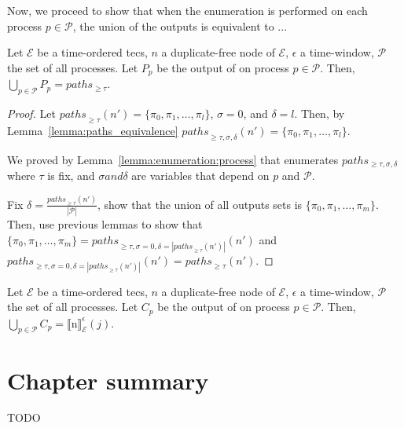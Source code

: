 Now, we proceed to show that when the enumeration is performed on each process $p \in \mathcal{P}$, the union of the outputs is equivalent to ...

\begin{lemma}\label{lemma:union_of_paths}
  Let $\mathcal{E}$ be a time-ordered \acrshort{tecs}, $n$ a duplicate-free node of $\mathcal{E}$, $\epsilon$ a time-window, $\mathcal{P}$ the set of all processes. Let $P_{p}$ be the output of  on process $p \in \mathcal{P}$. Then, $\bigcup\limits_{p \in \mathcal{P}} P_{p} = paths_{\ge \tau}$.
\end{lemma}

\begin{proof}
  Let ${paths}_{\ge \tau}(n') = \{\pi_{0}, \pi_{1}, \ldots, \pi_{l}\}$, $\sigma=0$, and $\delta = l$. Then, by Lemma~\ref{lemma:paths_equivalence} ${paths}_{\ge \tau, \sigma, \delta}(n') = \{\pi_{0}, \pi_{1}, \ldots, \pi_{l}\}$.

  We proved by Lemma~\ref{lemma:enumeration:process} that  enumerates $paths_{\ge \tau, \sigma, \delta}$ where $\tau$ is fix, and $\sigma and \delta$ are variables that depend on $p$ and $\mathcal{P}$.

  Fix $\delta = \frac{{paths}_{\ge \tau}(n')}{|\mathcal{P}|}$, show that the union of all outputs sets is $\{\pi_{0}, \pi_{1}, \ldots, \pi_{m}\}$. Then, use previous lemmas to show that $\{\pi_{0}, \pi_{1}, \ldots, \pi_{m}\} = {paths}_{\ge \tau, \sigma=0, \delta=|{paths}_{\ge \tau}(n')|}(n')$ and ${paths}_{\ge \tau, \sigma=0, \delta=|{paths}_{\ge \tau}(n')|}(n') = {paths}_{\ge \tau}(n')$.
\end{proof}



\begin{theorem}\label{theorem:enumeration}
  Let $\mathcal{E}$ be a time-ordered \acrshort{tecs}, $n$ a duplicate-free node of $\mathcal{E}$, $\epsilon$ a time-window, $\mathcal{P}$ the set of all processes. Let $C_{p}$ be the output of  on process $p \in \mathcal{P}$. Then, $\bigcup\limits_{p \in \mathcal{P}} C_{p} = {\llbracket \text{n} \rrbracket}^{\epsilon}_{\mathcal{E}}(j)$.
\end{theorem}


\section{Chapter summary}

TODO
